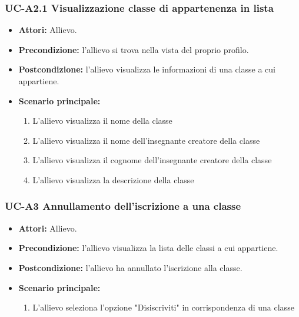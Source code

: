 \subsubsection{UC-A2.1 Visualizzazione classe di appartenenza in lista}
		\begin{itemize}
			\item \textbf{Attori:} Allievo.
			\item \textbf{Precondizione:} l'allievo si trova nella vista del proprio profilo.
			\item \textbf{Postcondizione:} l'allievo visualizza le informazioni di una classe a cui appartiene.
			\item \textbf{Scenario principale:}
			\begin{enumerate}
				\item L'allievo visualizza il nome della classe
				\item L'allievo visualizza il nome dell'insegnante creatore della classe
				\item L'allievo visualizza il cognome dell'insegnante creatore della classe
				\item L'allievo visualizza la descrizione della classe
			\end{enumerate}
		\end{itemize}	

	\subsubsection{UC-A3 Annullamento dell'iscrizione a una classe}
		\begin{itemize}
			\item \textbf{Attori:} Allievo.
			\item \textbf{Precondizione:} l'allievo visualizza la lista delle classi a cui appartiene.
			\item \textbf{Postcondizione:} l'allievo ha annullato l'iscrizione alla classe.
			\item \textbf{Scenario principale:}
			\begin{enumerate}
				\item L'allievo seleziona l'opzione "Disiscriviti" in corrispondenza di una classe
			\end{enumerate}
		\end{itemize}					
				
